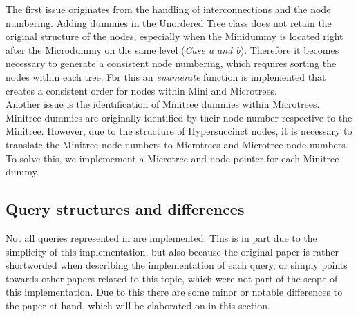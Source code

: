 \documentclass{article}
\begin{document}
The first issue originates from the handling of interconnections and the node numbering. Adding dummies in the Unordered Tree class does not retain the original structure of the nodes, especially when the Minidummy is located right after the Microdummy on the same level (\textit{Case a and b}). Therefore it becomes necessary to generate a consistent node numbering, which requires sorting the nodes within each tree. For this an \textit{enumerate} function is implemented that creates a consistent order for nodes within Mini and Microtrees.\\
Another issue is the identification of Minitree dummies within Microtrees. Minitree dummies are originally identified by their node number respective to the Minitree. However, due to the structure of Hypersuccinct nodes, it is necessary to translate the Minitree node numbers to Microtrees and Microtree node numbers. To solve this, we implemement a Microtree and node pointer for each Minitree dummy.

\subsection{Query structures and differences}
Not all queries represented in \cite{farzanMunro} are implemented. This is in part due to the simplicity of this implementation, but also because the original paper is rather shortworded when describing the implementation of each query, or simply points towards other papers related to this topic, which were not part of the scope of this implementation.
Due to this there are some minor or notable differences to the paper at hand, which will be elaborated on in this section.
\end{document}
